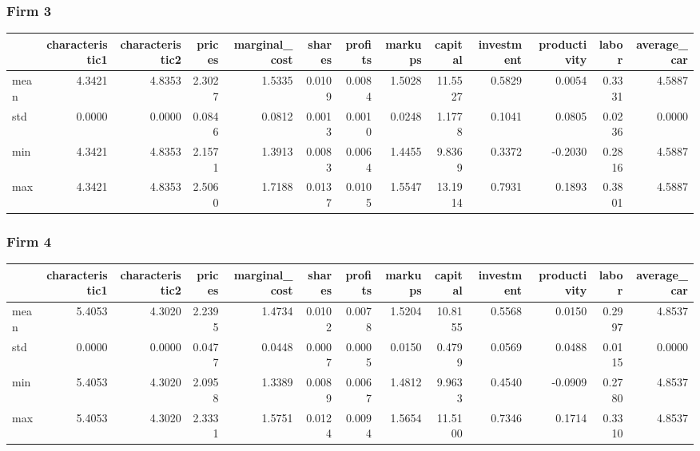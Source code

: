  \subsubsection*{Firm 3}
\begin{tabular}{lrrrrrrrrrrrr}
\toprule
{} &  characteristic1 &  characteristic2 &  prices &  marginal\_cost &  shares &  profits &  markups &  capital &  investment &  productivity &  labor &  average\_car \\
\midrule
mean &           4.3421 &           4.8353 &  2.3027 &         1.5335 &  0.0109 &   0.0084 &   1.5028 &  11.5527 &      0.5829 &        0.0054 & 0.3331 &       4.5887 \\
std  &           0.0000 &           0.0000 &  0.0846 &         0.0812 &  0.0013 &   0.0010 &   0.0248 &   1.1778 &      0.1041 &        0.0805 & 0.0236 &       0.0000 \\
min  &           4.3421 &           4.8353 &  2.1571 &         1.3913 &  0.0083 &   0.0064 &   1.4455 &   9.8369 &      0.3372 &       -0.2030 & 0.2816 &       4.5887 \\
max  &           4.3421 &           4.8353 &  2.5060 &         1.7188 &  0.0137 &   0.0105 &   1.5547 &  13.1914 &      0.7931 &        0.1893 & 0.3801 &       4.5887 \\
\bottomrule
\end{tabular}


 \subsubsection*{Firm 4}
\begin{tabular}{lrrrrrrrrrrrr}
\toprule
{} &  characteristic1 &  characteristic2 &  prices &  marginal\_cost &  shares &  profits &  markups &  capital &  investment &  productivity &  labor &  average\_car \\
\midrule
mean &           5.4053 &           4.3020 &  2.2395 &         1.4734 &  0.0102 &   0.0078 &   1.5204 &  10.8155 &      0.5568 &        0.0150 & 0.2997 &       4.8537 \\
std  &           0.0000 &           0.0000 &  0.0477 &         0.0448 &  0.0007 &   0.0005 &   0.0150 &   0.4799 &      0.0569 &        0.0488 & 0.0115 &       0.0000 \\
min  &           5.4053 &           4.3020 &  2.0958 &         1.3389 &  0.0089 &   0.0067 &   1.4812 &   9.9633 &      0.4540 &       -0.0909 & 0.2780 &       4.8537 \\
max  &           5.4053 &           4.3020 &  2.3331 &         1.5751 &  0.0124 &   0.0094 &   1.5654 &  11.5100 &      0.7346 &        0.1714 & 0.3310 &       4.8537 \\
\bottomrule
\end{tabular}


